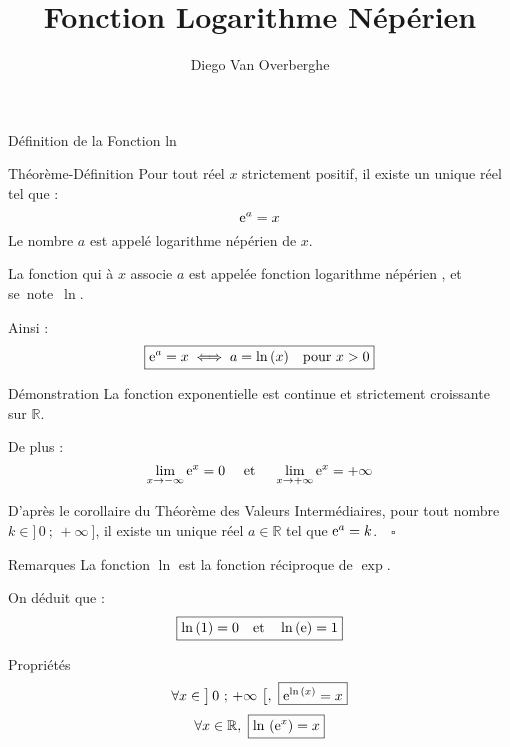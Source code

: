 \documentclass{cours}
\title{Fonction Logarithme Népérien}
\author{Diego Van Overberghe}
\begin{document}

    \begin{Gpartie}{Définition de la Fonction ln}
        \begin{Spartie}{Théorème-Définition}
            Pour tout réel $x$ strictement positif, il existe un unique réel tel que :
            \[\mathrm{e}^a=x\]
            Le nombre $a$ est appelé logarithme népérien de $x$.
            
            La fonction qui à $x$ associe $a$ est appelée \og fonction logarithme népérien \fg{}, et se~note~$\ln$.

            Ainsi :
            \[\boxed{\mathrm{e}^a=x\iff a=\ln\,(x)\quad\text{pour $x>0$}}\]
        \end{Spartie}
        \begin{Spartie}{Démonstration}
            La fonction exponentielle est continue et strictement croissante sur $\mathbb{R}$.

            De plus :
            \[\lim_{x\to -\infty} \mathrm{e}^x=0\quad\text{ et }\quad\lim_{x\to +\infty} \mathrm{e}^x=+\infty\]

            D'après le corollaire du Théorème des Valeurs Intermédiaires, pour tout nombre $k\in\big]\,0~;\,+\infty~\big]$, il existe un unique réel $a\in\mathbb{R}$ tel que $\mathrm{e}^a=k$.$\quad\square$
        \end{Spartie}
        \begin{Spartie}{Remarques}
            La fonction $\ln$ est la fonction réciproque de $\exp$.

            On déduit que : \[\boxed{\ln\,(1)=0\quad\text{et}\quad\ln\,(\mathrm{e})=1}\]
        \end{Spartie}
        \begin{Spartie}{Propriétés}
            \[\forall x\in\big]\,0~;\,+\infty~\big[,~\boxed{\mathrm{e}^{\ln\,(x)}=x}\]
            \[\forall x\in\mathbb{R},~\boxed{\ln\,\left(\mathrm{e}^x\right)=x}\]
        \end{Spartie}
    \end{Gpartie}
    \pagebreak
\end{document}
